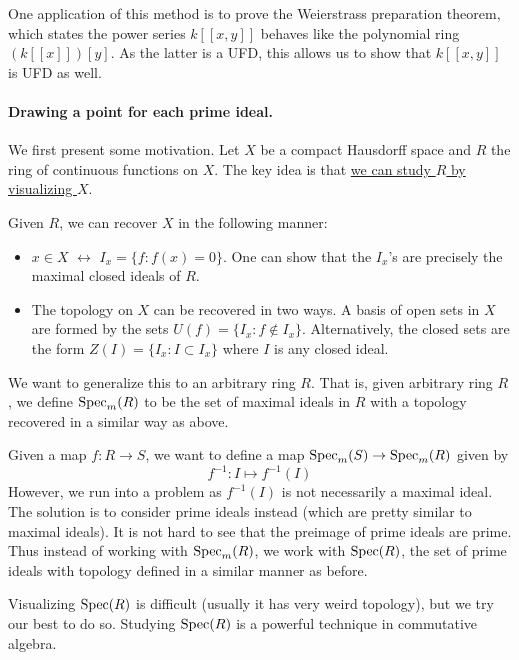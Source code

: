 One application of this method is to prove the Weierstrass preparation theorem, which states the power series $k[[x,y]]$ behaves like the polynomial ring $(k[[x]])[y]$. As the latter is a UFD, this allows us to show that $k[[x,y]]$ is UFD as well.

\paragraph{Drawing a point for each prime ideal.} We first present some motivation. Let $X$ be a compact Hausdorff space and $R$ the ring of continuous functions on $X$. The key idea is that \underline{we can study $R$ by visualizing $X$}.

Given $R$, we can recover $X$ in the following manner:
\begin{itemize}
    \item $x \in X$ $\longleftrightarrow$ $I_x = \{f : f(x) = 0\}$. One can show that the $I_x$'s are precisely the maximal closed ideals of $R$.
    \item The topology on $X$ can be recovered in two ways. A basis of open sets in $X$ are formed by the sets $U(f) = \{I_x : f \not \in I_x\}$. Alternatively, the closed sets are the form $Z(I) = \{I_x : I \subset I_x\}$ where $I$ is any closed ideal.
\end{itemize}
We want to generalize this to an arbitrary ring $R$. That is, given arbitrary ring $R$, we define $\operatorname{Spec}_m(R)$ to be the set of maximal ideals in $R$ with a topology recovered in a similar way as above.

Given a map $f: R \to S$, we want to define a map $\operatorname{Spec}_m(S) \to \operatorname{Spec}_m(R)$ given by
\[
    f^{-1}: I \mapsto f^{-1}(I)
\]
However, we run into a problem as $f^{-1}(I)$ is not necessarily a maximal ideal. The solution is to consider prime ideals instead (which are pretty similar to maximal ideals). It is not hard to see that the preimage of prime ideals are prime. Thus instead of working with $\operatorname{Spec}_m(R)$, we work with $\operatorname{Spec}(R)$, the set of prime ideals with topology defined in a similar manner as before.

Visualizing $\operatorname{Spec}(R)$ is difficult (usually it has very weird topology), but we try our best to do so. Studying $\operatorname{Spec}(R)$ is a powerful technique in commutative algebra.


